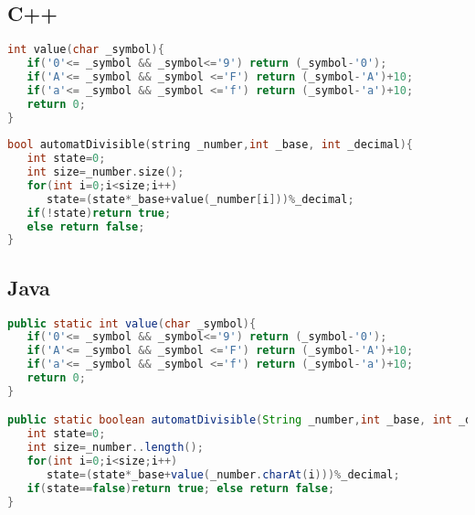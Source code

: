\subsection{C++}

\begin{lstlisting}[language=C++]
int value(char _symbol){
   if('0'<= _symbol && _symbol<='9') return (_symbol-'0');
   if('A'<= _symbol && _symbol <='F') return (_symbol-'A')+10;
   if('a'<= _symbol && _symbol <='f') return (_symbol-'a')+10;
   return 0;
}
	
bool automatDivisible(string _number,int _base, int _decimal){
   int state=0;
   int size=_number.size();
   for(int i=0;i<size;i++)
      state=(state*_base+value(_number[i]))%_decimal;
   if(!state)return true;
   else return false;
}
\end{lstlisting} 

\subsection{Java}
\begin{lstlisting}[language=Java]
public static int value(char _symbol){
   if('0'<= _symbol && _symbol<='9') return (_symbol-'0');
   if('A'<= _symbol && _symbol <='F') return (_symbol-'A')+10;
   if('a'<= _symbol && _symbol <='f') return (_symbol-'a')+10;
   return 0;
}

public static boolean automatDivisible(String _number,int _base, int _decimal){
   int state=0;
   int size=_number..length();
   for(int i=0;i<size;i++)
      state=(state*_base+value(_number.charAt(i)))%_decimal;
   if(state==false)return true; else return false;
}
\end{lstlisting} 